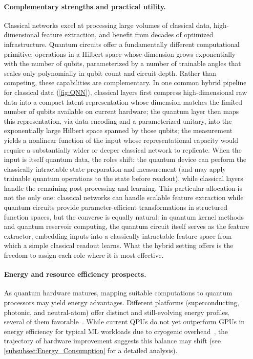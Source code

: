 \documentclass[aps,10pt,groupedaddress,prx,superscriptaddress,twocolumn,balancelastpage, tightenlines]{revtex4-2}
\theoremstyle{plain}  %
\begin{document}
\paragraph{Complementary strengths and practical utility.}

Classical networks excel at processing large volumes of classical data, high-dimensional feature extraction, and benefit from decades of optimized infrastructure. Quantum circuits offer a fundamentally different computational primitive: operations in a Hilbert space whose dimension grows
exponentially with the number of qubits, parameterized by a number of trainable angles that scales only polynomially in qubit count and circuit depth. Rather than competing, these capabilities are complementary. In one common hybrid pipeline for classical data (\autoref{fig:QNN}), classical layers first compress high-dimensional raw data into a compact latent representation whose dimension matches the limited number of qubits available on current hardware; the quantum layer then maps this representation, via data encoding and a parameterized unitary, into the exponentially large Hilbert space spanned by those qubits; the measurement yields a nonlinear function of the input whose representational capacity would require a substantially wider or deeper classical network to
replicate. When the input is itself quantum data, the roles shift: the quantum device can perform the classically intractable state preparation and measurement (and may apply trainable quantum operations to the state before readout), while classical layers handle the remaining post-processing and learning. This particular allocation is not the only one: classical networks can handle scalable feature extraction while quantum circuits provide parameter-efficient transformations in structured function spaces, but the converse is equally natural: in quantum kernel methods and quantum reservoir computing, the quantum circuit itself serves as the feature extractor, embedding inputs into a classically intractable feature space from which a simple classical readout learns. What the hybrid setting offers is the freedom to assign each role where it is most effective.

\paragraph{Energy and resource efficiency prospects.}

As quantum hardware matures, mapping suitable computations to quantum processors may yield energy advantages. Different platforms (superconducting, photonic, and neutral-atom) offer distinct and still-evolving energy profiles, several of them favorable~\cite{auffeves2022quantum}. While current QPUs do not yet outperform GPUs in energy efficiency for typical ML workloads due to cryogenic overhead~\cite{jaschke2023quantum, fellous2023limitations}, the trajectory of hardware improvement suggests this balance may shift (see \autoref{subsubsec:Energy_Consumption} for a detailed analysis).
\end{document}
